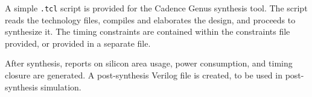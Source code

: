 A simple {\tt .tcl} script is provided for the Cadence Genus synthesis tool. The
script reads the technology files, compiles and elaborates the design, and
proceeds to synthesize it. The timing constraints are contained within the
constraints file provided, or provided in a separate file.

After synthesis, reports on silicon area usage, power consumption, and timing
closure are generated. A post-synthesis Verilog file is created, to be used in
post-synthesis simulation.


